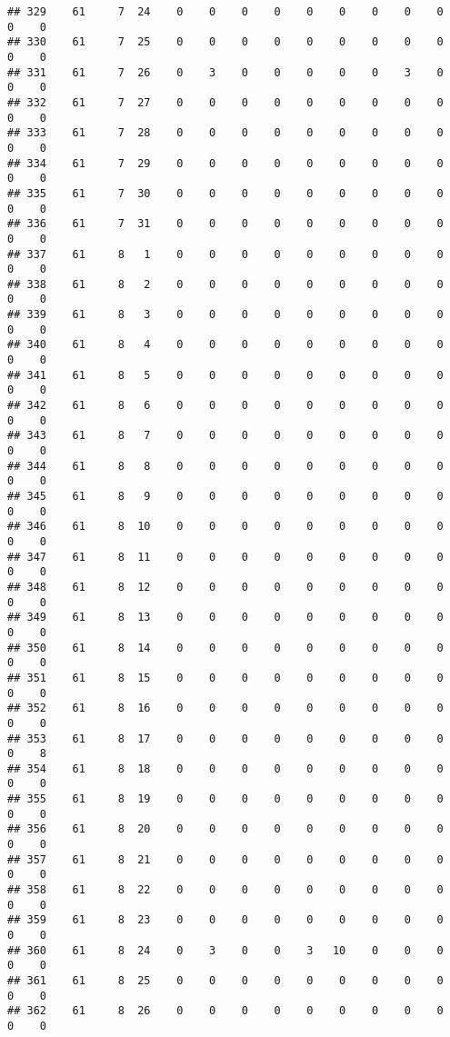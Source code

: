 \documentclass[]{article}
\begin{document}
\begin{verbatim}
## 329    61     7  24    0    0    0    0    0    0    0    0    0    0    0
## 330    61     7  25    0    0    0    0    0    0    0    0    0    0    0
## 331    61     7  26    0    3    0    0    0    0    0    3    0    0    0
## 332    61     7  27    0    0    0    0    0    0    0    0    0    0    0
## 333    61     7  28    0    0    0    0    0    0    0    0    0    0    0
## 334    61     7  29    0    0    0    0    0    0    0    0    0    0    0
## 335    61     7  30    0    0    0    0    0    0    0    0    0    0    0
## 336    61     7  31    0    0    0    0    0    0    0    0    0    0    0
## 337    61     8   1    0    0    0    0    0    0    0    0    0    0    0
## 338    61     8   2    0    0    0    0    0    0    0    0    0    0    0
## 339    61     8   3    0    0    0    0    0    0    0    0    0    0    0
## 340    61     8   4    0    0    0    0    0    0    0    0    0    0    0
## 341    61     8   5    0    0    0    0    0    0    0    0    0    0    0
## 342    61     8   6    0    0    0    0    0    0    0    0    0    0    0
## 343    61     8   7    0    0    0    0    0    0    0    0    0    0    0
## 344    61     8   8    0    0    0    0    0    0    0    0    0    0    0
## 345    61     8   9    0    0    0    0    0    0    0    0    0    0    0
## 346    61     8  10    0    0    0    0    0    0    0    0    0    0    0
## 347    61     8  11    0    0    0    0    0    0    0    0    0    0    0
## 348    61     8  12    0    0    0    0    0    0    0    0    0    0    0
## 349    61     8  13    0    0    0    0    0    0    0    0    0    0    0
## 350    61     8  14    0    0    0    0    0    0    0    0    0    0    0
## 351    61     8  15    0    0    0    0    0    0    0    0    0    0    0
## 352    61     8  16    0    0    0    0    0    0    0    0    0    0    0
## 353    61     8  17    0    0    0    0    0    0    0    0    0    0    8
## 354    61     8  18    0    0    0    0    0    0    0    0    0    0    0
## 355    61     8  19    0    0    0    0    0    0    0    0    0    0    0
## 356    61     8  20    0    0    0    0    0    0    0    0    0    0    0
## 357    61     8  21    0    0    0    0    0    0    0    0    0    0    0
## 358    61     8  22    0    0    0    0    0    0    0    0    0    0    0
## 359    61     8  23    0    0    0    0    0    0    0    0    0    0    0
## 360    61     8  24    0    3    0    0    3   10    0    0    0    0    0
## 361    61     8  25    0    0    0    0    0    0    0    0    0    0    0
## 362    61     8  26    0    0    0    0    0    0    0    0    0    0    0

\end{verbatim}
\end{document}
